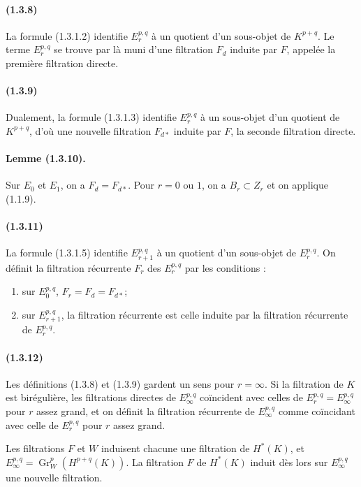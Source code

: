 \documentclass[10pt]{article}
\newcommand{\Gr}{\operatorname{Gr}}
\begin{document}
\paragraph{(1.3.8)} La formule (1.3.1.2) identifie $E_r^{p,q}$ à un quotient d'un sous-objet de $K^{p+q}$. Le terme $E_r^{p,q}$ se trouve par là muni d'une filtration $F_d$ induite par $F$, appelée la première filtration directe.

\paragraph{(1.3.9)} Dualement, la formule (1.3.1.3) identifie $E_r^{p,q}$ à un sous-objet d'un quotient de $K^{p+q}$, d'où une nouvelle filtration $F_{d*}$ induite par $F$, la seconde filtration directe.

\paragraph{Lemme (1.3.10).} Sur $E_0$ et $E_1$, on a $F_d=F_{d*}$. Pour $r=0$ ou $1$, on a $B_r\subset Z_r$ et on applique (1.1.9).

\paragraph{(1.3.11)} La formule (1.3.1.5) identifie $E_{r+1}^{p,q}$ à un quotient d'un sous-objet de $E_r^{p,q}$. On définit la filtration récurrente $F_r$ des $E_r^{p,q}$ par les conditions :
\begin{enumerate}[label=(\roman*)]
\item sur $E_0^{p,q}$, $F_r=F_d=F_{d*}$;
\item sur $E_{r+1}^{p,q}$, la filtration récurrente est celle induite par la filtration récurrente de $E_r^{p,q}$.
\end{enumerate}

\paragraph{(1.3.12)} Les définitions (1.3.8) et (1.3.9) gardent un sens pour $r=\infty$. Si la filtration de $K$ est birégulière, les filtrations directes de $E_\infty^{p,q}$ coïncident avec celles de $E_r^{p,q}=E_\infty^{p,q}$ pour $r$ assez grand, et on définit la filtration récurrente de $E_\infty^{p,q}$ comme coïncidant avec celle de $E_r^{p,q}$ pour $r$ assez grand.

Les filtrations $F$ et $W$ induisent chacune une filtration de $H^*(K)$, et $E_\infty^{p,q}=\Gr_W^p(H^{p+q}(K))$. La filtration $F$ de $H^*(K)$ induit dès lors sur $E_\infty^{p,q}$ une nouvelle filtration.
\end{document}
